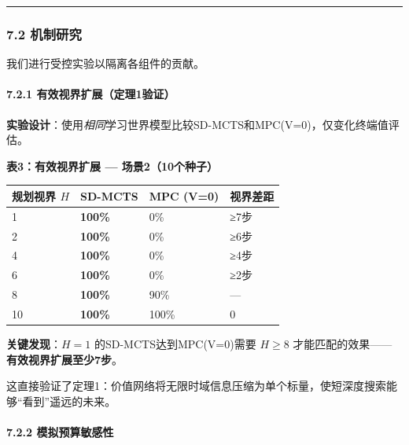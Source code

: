 \documentclass[UTF8]{ctexart}
\let\oldparagraph\paragraph
\renewcommand{\paragraph}[1]{\oldparagraph{#1}\mbox{}}
\begin{document}
\begin{center}\rule{0.5\linewidth}{0.4pt}\end{center}

\hypertarget{ux673aux5236ux7814ux7a76}{%
\subsubsection{7.2 机制研究}\label{ux673aux5236ux7814ux7a76}}

我们进行受控实验以隔离各组件的贡献。

\hypertarget{ux6709ux6548ux89c6ux754cux6269ux5c55ux5b9aux74061ux9a8cux8bc1}{%
\paragraph{7.2.1
有效视界扩展（定理1验证）}\label{ux6709ux6548ux89c6ux754cux6269ux5c55ux5b9aux74061ux9a8cux8bc1}}

\textbf{实验设计}：使用\emph{相同}学习世界模型比较SD-MCTS和MPC(V=0)，仅变化终端值评估。

\textbf{表3：有效视界扩展 --- 场景2（10个种子）}

\begin{table}[h]
\centering
\begin{tabular}{p{4cm}p{3cm}p{3cm}p{3cm}}
\toprule
\textbf{规划视界 \(H\)} & \textbf{SD-MCTS} & \textbf{MPC (V=0)} & \textbf{视界差距} \\
\midrule
1 & \textbf{100\%} & 0\% & ≥7步 \\
2 & \textbf{100\%} & 0\% & ≥6步 \\
4 & \textbf{100\%} & 0\% & ≥4步 \\
6 & \textbf{100\%} & 0\% & ≥2步 \\
8 & \textbf{100\%} & 90\% & --- \\
10 & \textbf{100\%} & 100\% & 0 \\
\bottomrule
\end{tabular}
\end{table}

\textbf{关键发现}：\(H=1\) 的SD-MCTS达到MPC(V=0)需要 \(H \geq 8\)
才能匹配的效果------\textbf{有效视界扩展至少7步}。

这直接验证了定理1：价值网络将无限时域信息压缩为单个标量，使短深度搜索能够``看到''遥远的未来。

\hypertarget{ux6a21ux62dfux9884ux7b97ux654fux611fux6027}{%
\paragraph{7.2.2
模拟预算敏感性}\label{ux6a21ux62dfux9884ux7b97ux654fux611fux6027}}
\end{document}
